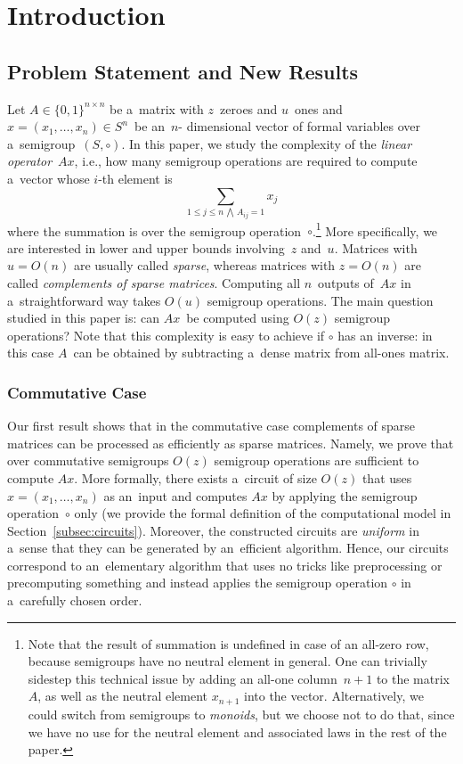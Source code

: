 \documentclass[11pt,letterpaper]{article}
\begin{document}
\clearpage
\tableofcontents
\clearpage

\section{Introduction}
\subsection{Problem Statement and New Results}

Let $A \in \{0,1\}^{n \times n}$ be a~matrix with $z$~zeroes
and $u$~ones and $x=(x_1, \dotsc, x_n) \in S^n$~be an~$n$-
dimensional vector
of formal variables over a~semigroup~$(S, \circ)$. In this paper, 
we study the
complexity of the \emph{linear operator}~$Ax$, 
i.e., how many semigroup
operations are required to compute a~vector whose $i$-th element is
\[
\sum_{1 \le j \le n\,\bigwedge\,A_{ij}=1}x_j
\]
where the summation is over the semigroup operation~$\circ$.\footnote{Note that the result of
summation is undefined in case of an all-zero row, because semigroups have no
neutral element in general. One can trivially sidestep this technical issue by
adding an all-one column~$n+1$ to the matrix~$A$, as well as the neutral element
$x_{n+1}$ into the vector. Alternatively, we could switch from semigroups to
\emph{monoids}, but we choose not to do that, since we have no use
for the neutral element and associated laws in the rest of the paper.}
More specifically, we are interested in lower and
upper bounds involving~$z$ and~$u$.
Matrices with $u=O(n)$ are usually called \emph{sparse},
whereas matrices with $z=O(n)$
are called \emph{complements of sparse matrices}.
Computing all $n$~outputs
of~$Ax$ in a~straightforward way takes
$O(u)$ semigroup operations.
The main question studied in this paper is:
can $Ax$~be computed using $O(z)$ semigroup
operations? Note that this complexity is easy to achieve if $\circ$ has an inverse: in this case $A$~can be obtained by subtracting 
a~dense matrix from all-ones matrix. 

\subsubsection{Commutative Case}
Our first result shows that in the commutative case complements 
of sparse matrices can be processed as
efficiently as sparse matrices. Namely, we prove 
that over commutative semigroups $O(z)$ semigroup operations
are sufficient to compute $Ax$. More formally, there exists 
a~circuit of size $O(z)$ that uses $x=(x_1, \dotsc, x_n)$ as 
an~input and computes $Ax$ by applying the semigroup 
operation~$\circ$ only (we provide the formal definition of the 
computational model in Section~\ref{subsec:circuits}). Moreover, 
the constructed circuits are \emph{uniform} in a~sense that they 
can be generated by an~efficient algorithm. Hence, our circuits 
correspond to an~elementary algorithm that uses no tricks like 
preprocessing or precomputing something and instead applies
the semigroup operation $\circ$ in a~carefully chosen order.
\end{document}
